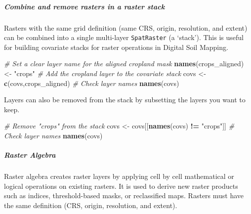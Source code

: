 \documentclass[
  10pt,
  b5paper,
  oneside]{book}
\newenvironment{Shaded}{\begin{snugshade}}{\end{snugshade}}
\newcommand{\CommentTok}[1]{\textcolor[rgb]{0.56,0.35,0.01}{\textit{#1}}}
\newcommand{\FunctionTok}[1]{\textcolor[rgb]{0.13,0.29,0.53}{\textbf{#1}}}
\newcommand{\NormalTok}[1]{#1}
\newcommand{\OtherTok}[1]{\textcolor[rgb]{0.56,0.35,0.01}{#1}}
\newcommand{\SpecialCharTok}[1]{\textcolor[rgb]{0.81,0.36,0.00}{\textbf{#1}}}
\newcommand{\StringTok}[1]{\textcolor[rgb]{0.31,0.60,0.02}{#1}}
\begin{document}
\subparagraph*{Combine and remove rasters in a raster stack}\label{combine-and-remove-rasters-in-a-raster-stack}

Rasters with the same grid definition (same CRS, origin, resolution, and extent) can be combined into a single multi-layer \texttt{SpatRaster} (a `stack'). This is useful for building covariate stacks for raster operations in Digital Soil Mapping.

\begin{Shaded}
\begin{Highlighting}[]
\CommentTok{\# Set a clear layer name for the aligned cropland mask}
\FunctionTok{names}\NormalTok{(crops\_aligned) }\OtherTok{\textless{}{-}} \StringTok{"crops"}
\CommentTok{\# Add the cropland layer to the covariate stack}
\NormalTok{covs }\OtherTok{\textless{}{-}} \FunctionTok{c}\NormalTok{(covs,crops\_aligned)}
\CommentTok{\# Check layer names}
\FunctionTok{names}\NormalTok{(covs)}
\end{Highlighting}
\end{Shaded}

Layers can also be removed from the stack by subsetting the layers you want to keep.

\begin{Shaded}
\begin{Highlighting}[]
\CommentTok{\# Remove "crops" from the stack}
\NormalTok{covs }\OtherTok{\textless{}{-}}\NormalTok{ covs[[}\FunctionTok{names}\NormalTok{(covs) }\SpecialCharTok{!=} \StringTok{"crops"}\NormalTok{]]}
\CommentTok{\# Check layer names}
\FunctionTok{names}\NormalTok{(covs)}
\end{Highlighting}
\end{Shaded}

\subparagraph*{Raster Algebra}\label{raster-algebra}

Raster algebra creates raster layers by applying cell by cell mathematical or logical operations on existing rasters. It is used to derive new raster products such as indices, threshold-based masks, or reclassified maps. Rasters must have the same definition (CRS, origin, resolution, and extent).
\end{document}
